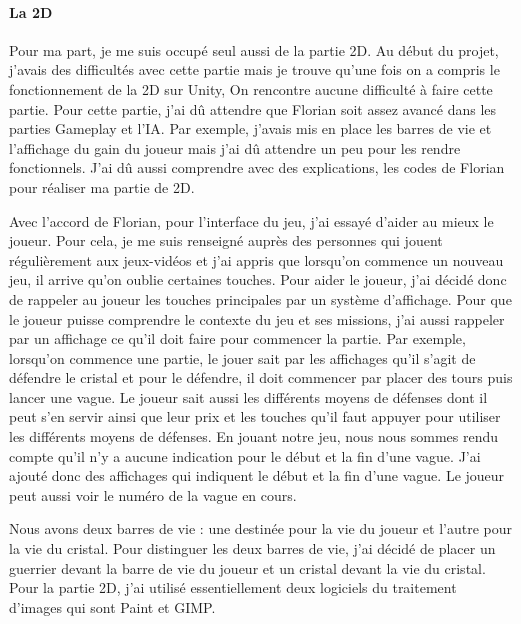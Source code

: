 \documentclass[a4paper, 12pt]{article}
\begin{document}
\paragraph{La 2D}
Pour ma part, je me suis occupé seul aussi de la partie 2D. Au début du projet, j’avais des difficultés avec cette partie mais je trouve qu’une fois on a compris le fonctionnement de la 2D sur Unity, On rencontre aucune difficulté à faire cette partie. Pour cette partie, j’ai dû attendre que Florian soit assez avancé dans les parties Gameplay et l’IA. Par exemple, j’avais mis en place les barres de vie et l’affichage du gain du joueur mais j’ai dû attendre un peu pour les rendre fonctionnels. J’ai dû aussi comprendre avec des explications, les codes de Florian pour réaliser ma partie de 2D.
\par Avec l’accord de Florian, pour l’interface du jeu, j’ai essayé d’aider au mieux le joueur. Pour cela, je me suis renseigné auprès des personnes qui jouent régulièrement aux jeux-vidéos et j’ai appris que lorsqu’on commence un nouveau jeu, il arrive qu’on oublie certaines touches. Pour aider le joueur, j’ai décidé donc de rappeler au joueur les touches principales par un système d’affichage. Pour que le joueur puisse comprendre le contexte du jeu et ses missions, j’ai aussi rappeler par un affichage ce qu’il doit faire pour commencer la partie. Par exemple, lorsqu’on commence une partie, le jouer sait par les affichages qu’il s’agit de défendre le cristal et pour le défendre, il doit commencer par placer des tours puis lancer une vague. Le joueur sait aussi les différents moyens de défenses dont il peut s’en servir ainsi que leur prix et les touches qu’il faut appuyer pour utiliser les différents moyens de défenses.   En jouant notre jeu, nous nous sommes rendu compte qu’il n’y a aucune indication pour le début et la fin d’une vague. J’ai ajouté donc des affichages qui indiquent le début et la fin d’une vague. Le joueur peut aussi voir le numéro de la vague en cours.
\par Nous avons deux barres de vie : une destinée pour la vie du joueur et l’autre pour la vie du cristal. Pour distinguer les deux barres de vie, j’ai décidé de placer un guerrier devant la barre de vie du joueur et un cristal devant la vie du cristal. Pour la partie 2D, j’ai utilisé essentiellement deux logiciels du traitement d’images qui sont Paint et GIMP.
\end{document}
